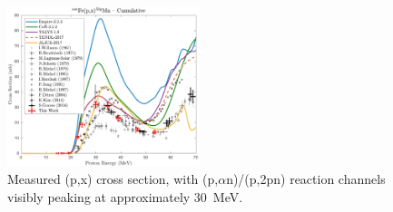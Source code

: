 \begin{figure}[h]
 \centering
 \includegraphics[width=0.5\textwidth]{./figures/52Mn.pdf}
 \caption{Measured (p,x) cross section, with (p,$\alpha$n)/(p,2pn) reaction channels visibly peaking at approximately \mbox{30 MeV}.}
 \label{fig:temp_52Mn}
\end{figure}


